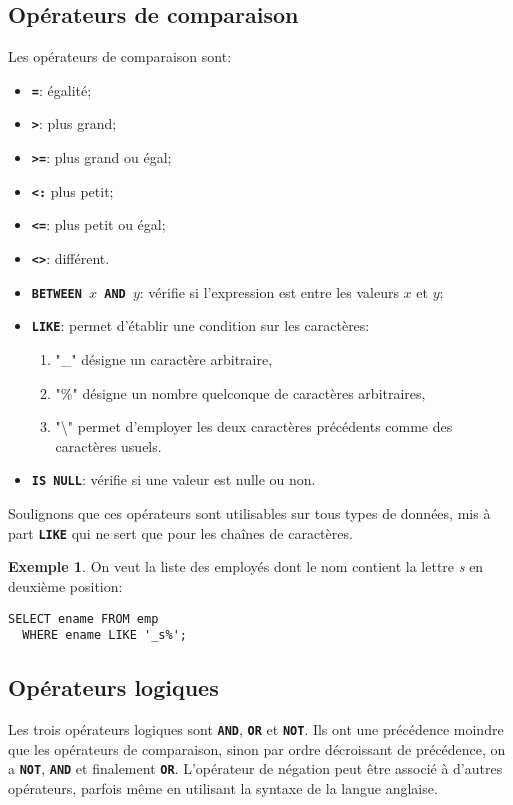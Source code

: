 \documentclass[a4paper, 12pt]{report}
\newcommand{\textSQL}[1]{\texttt{\textbf{#1}}}
\theoremstyle{definition} \newtheorem{ex}{Exemple}
\begin{document}
\subsection{Opérateurs de comparaison}
Les opérateurs de comparaison sont:
\begin{itemize}
	\item \textSQL{=}: égalité;
	\item \textSQL{>}: plus grand;
	\item \textSQL{>=}: plus grand ou égal;
	\item \textSQL{<:} plus petit;
	\item \textSQL{<=}: plus petit ou égal;
	\item \textSQL{<>}: différent.
	\item \textSQL{BETWEEN $x$ AND $y$}: vérifie si l'expression est entre les valeurs $x$ et $y$;
	\item \textSQL{LIKE}: permet d'établir une condition sur les caractères:
	\begin{enumerate}
		\item "\_" désigne un caractère arbitraire,
		\item "\%" désigne un nombre quelconque de caractères arbitraires,
		\item"\textbackslash{}" permet d'employer les deux caractères précédents comme des caractères usuels.
	\end{enumerate}
	\item \textSQL{IS NULL}: vérifie si une valeur est nulle ou non.
\end{itemize}

Soulignons que ces opérateurs sont utilisables sur tous types de données, mis à part \textSQL{LIKE} qui ne sert que pour les chaînes de caractères.
\begin{ex}
 On veut la liste des employés dont le nom contient la lettre \emph{s} en deuxième position:

\begin{lstlisting}[frame=single]
SELECT ename FROM emp
  WHERE ename LIKE '_s%';
\end{lstlisting}
\end{ex}
\subsection{Opérateurs logiques}
Les trois opérateurs logiques sont \textSQL{AND}, \textSQL{OR} et \textSQL{NOT}. Ils ont une précédence moindre que les opérateurs de comparaison, sinon par ordre décroissant de précédence, on a \textSQL{NOT}, \textSQL{AND} et finalement \textSQL{OR}. L'opérateur de négation peut être associé à d'autres opérateurs, parfois même en utilisant  la syntaxe de la langue anglaise.
\end{document}
